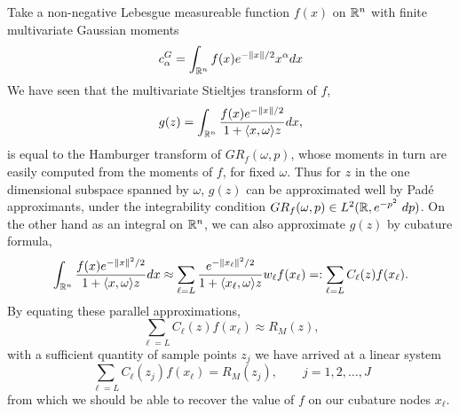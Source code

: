 Take a non-negative Lebesgue measureable function $f(x)$ on $\mathbb{R}^n$ with finite multivariate Gaussian moments
\[
  c^G_\alpha = \int_{\mathbb{R}^n} f(x)e^{-\|x\|/2} x^\alpha dx
\]
We have seen that the multivariate Stieltjes transform of $f$, 
\[
  g(z) = \int_{\mathbb{R}^n} \frac{f(x)e^{-\|x\|/2}}{1 + \langle x, \omega \rangle z} dx,
\]
is equal to the Hamburger transform of $GR_f(\omega, p)$, whose moments in turn are easily computed from the moments of $f$, for fixed $\omega$. Thus for $z$ in the one dimensional subspace spanned by $\omega$, $g(z)$ can be approximated well by Pad\'e approximants, under the integrability condition $GR_f(\omega, p) \in L^2(\mathbb{R}, e^{-p^2}~dp)$. On the other hand as an integral on $\mathbb{R}^n$, we can also approximate $g(z)$ by cubature formula,
\[
  \int_{\mathbb{R}^n} \frac{f(x)e^{-\|x\|^2/2}}{1 + \langle x, \omega \rangle z} dx 
  \approx \sum_{\ell = L} \frac{e^{-\|x_\ell\|^2/2}}{1 + \langle x_\ell, \omega \rangle z} w_\ell f(x_\ell)
  =: \sum_{\ell = L} C_\ell(z) f(x_\ell).
\]
By equating these parallel approximations, 
\[
    \sum_{\ell = L} C_\ell(z) f(x_\ell) \approx R_M(z),
\]
with a sufficient quantity of sample points $z_j$ we have arrived at a linear system
\[
  \sum_{\ell = L} C_\ell(z_j) f(x_\ell) = R_M(z_j), 
  \qquad j = 1, 2, \ldots, J
\]
from which we should be able to recover the value of $f$ on our cubature nodes $x_\ell$.




